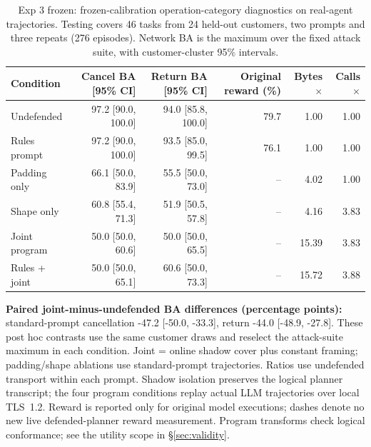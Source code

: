 \begin{table}[t]\centering\small
\caption{Exp 3 frozen: frozen-calibration operation-category diagnostics on real-agent trajectories. Testing covers 46 tasks from 24 held-out customers, two prompts and three repeats (276 episodes). Network BA is the maximum over the fixed attack suite, with customer-cluster 95\% intervals.}\label{tab:r4-primary}
\begin{tabular}{@{}lrrrrr@{}}\toprule
Condition & Cancel BA [95\% CI] & Return BA [95\% CI] & Original reward (\%) & Bytes$\times$ & Calls$\times$\\\midrule
Undefended & 97.2 [90.0, 100.0] & 94.0 [85.8, 100.0] & 79.7 & 1.00 & 1.00\\
Rules prompt & 97.2 [90.0, 100.0] & 93.5 [85.0, 99.5] & 76.1 & 1.00 & 1.00\\
Padding only & 66.1 [50.0, 83.9] & 55.5 [50.0, 73.0] & -- & 4.02 & 1.00\\
Shape only & 60.8 [55.4, 71.3] & 51.9 [50.5, 57.8] & -- & 4.16 & 3.83\\
Joint program & 50.0 [50.0, 60.6] & 50.0 [50.0, 65.5] & -- & 15.39 & 3.83\\
Rules + joint & 50.0 [50.0, 65.1] & 60.6 [50.0, 73.3] & -- & 15.72 & 3.88\\
\bottomrule\end{tabular}
\par\smallskip\raggedright \textbf{Paired joint-minus-undefended BA differences (percentage points):} standard-prompt cancellation -47.2 [-50.0, -33.3], return -44.0 [-48.9, -27.8]. These post hoc contrasts use the same customer draws and reselect the attack-suite maximum in each condition. Joint = online shadow cover plus constant framing; padding/shape ablations use standard-prompt trajectories. Ratios use undefended transport within each prompt. Shadow isolation preserves the logical planner transcript; the four program conditions replay actual LLM trajectories over local TLS~1.2. Reward is reported only for original model executions; dashes denote no new live defended-planner reward measurement. Program transforms check logical conformance; see the utility scope in \S\ref{sec:validity}.
\end{table}
